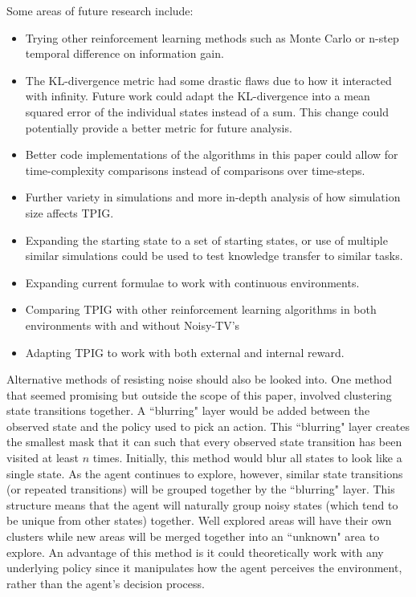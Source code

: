\documentclass[12pt]{thesis}
\begin{document}
Some areas of future research include:
\begin{itemize}
	\item Trying other reinforcement learning methods such as Monte Carlo or n-step temporal difference on information gain.
	\item The KL-divergence metric had some drastic flaws due to how it interacted with infinity. Future work could adapt the KL-divergence into a mean squared error of the individual states instead of a sum. This change could potentially provide a better metric for future analysis.
	\item Better code implementations of the algorithms in this paper could allow for time-complexity comparisons instead of comparisons over time-steps.
	\item Further variety in simulations and more in-depth analysis of how simulation size affects TPIG.
	\item Expanding the starting state to a set of starting states, or use of multiple similar simulations could be used to test knowledge transfer to similar tasks.
	\item Expanding current formulae to work with continuous environments.
	\item Comparing TPIG with other reinforcement learning algorithms in both environments with and without Noisy-TV's
	\item Adapting TPIG to work with both external and internal reward.
\end{itemize}

Alternative methods of resisting noise should also be looked into. One method that seemed promising but outside the scope of this paper, involved clustering state transitions together. A ``blurring" layer would be added between the observed state and the policy used to pick an action. This ``blurring" layer creates the smallest mask that it can such that every observed state transition has been visited at least $n$ times. Initially, this method would blur all states to look like a single state. As the agent continues to explore, however, similar state transitions (or repeated transitions) will be grouped together by the ``blurring" layer. This structure means that the agent will naturally group noisy states (which tend to be unique from other states) together. Well explored areas will have their own clusters while new areas will be merged together into an ``unknown" area to explore. An advantage of this method is it could theoretically work with any underlying policy since it manipulates how the agent perceives the environment, rather than the agent's decision process.
\end{document}

